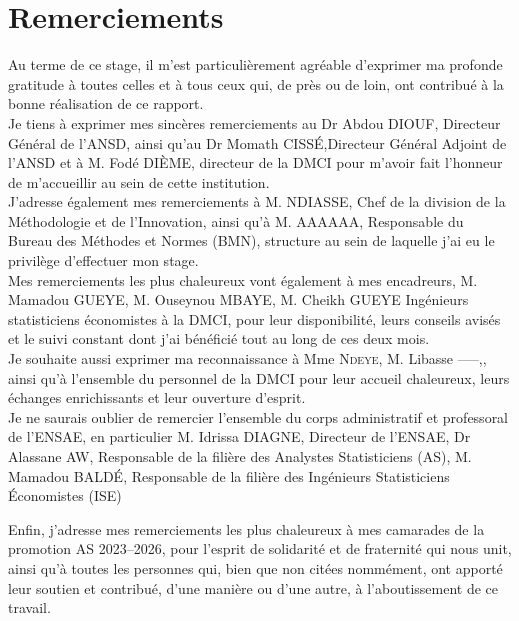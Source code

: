 \chapter*{Remerciements}

Au terme de ce stage, il m’est particulièrement agréable d’exprimer ma profonde gratitude à toutes celles et à tous ceux qui, de près ou de loin, ont contribué à la bonne réalisation de ce rapport.\\

Je tiens à exprimer mes sincères remerciements au Dr Abdou \textsc{DIOUF}, Directeur Général de l’ANSD, ainsi qu’au Dr Momath \textsc{CISSÉ},Directeur Général Adjoint de l’ANSD et à M. Fodé \textsc{DIÈME}, directeur de la DMCI pour m’avoir fait l’honneur de m’accueillir au sein de cette institution.\\

J’adresse également mes remerciements à M. \textsc{NDIASSE}, Chef de la division de la Méthodologie et de l’Innovation, ainsi qu’à M. \textsc{AAAAAA}, Responsable du Bureau des Méthodes et Normes (BMN), structure au sein de laquelle j’ai eu le privilège d’effectuer mon stage.\\

Mes remerciements les plus chaleureux vont également à mes encadreurs, M. Mamadou \textsc{GUEYE}, M. Ouseynou \textsc{MBAYE}, M. Cheikh \textsc{GUEYE} Ingénieurs statisticiens économistes à la DMCI, pour leur disponibilité, leurs conseils avisés et le suivi constant dont j’ai bénéficié tout au long de ces deux mois.\\  

Je souhaite aussi exprimer ma reconnaissance à Mme \textsc{Ndeye}, M. Libasse \textsc{-----},, ainsi qu’à l’ensemble du personnel de la DMCI pour leur accueil chaleureux, leurs échanges enrichissants et leur ouverture d’esprit.\\

Je ne saurais oublier de remercier l’ensemble du corps administratif et professoral de l’ENSAE, en particulier M. Idrissa \textsc{DIAGNE}, Directeur de l’ENSAE, Dr Alassane \textsc{AW}, Responsable de la filière des Analystes Statisticiens (AS), M. Mamadou \textsc{BALDÉ}, Responsable de la filière des Ingénieurs Statisticiens Économistes (ISE)%

Enfin, j’adresse mes remerciements les plus chaleureux à mes camarades de la promotion \textsc{AS 2023--2026}, pour l’esprit de solidarité et de fraternité qui nous unit, ainsi qu’à toutes les personnes qui, bien que non citées nommément, ont apporté leur soutien et contribué, d’une manière ou d’une autre, à l’aboutissement de ce travail.  

